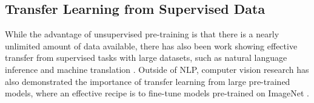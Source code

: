 \subsection {Transfer Learning from Supervised Data}
While the advantage of unsupervised pre-training is that there is a nearly unlimited amount of data available, there has also been work showing effective transfer from supervised tasks with large datasets, such as natural language inference \citep{Alexis2017} and machine translation \citep{Bryan2017}. Outside of NLP, computer vision research has also demonstrated the importance of transfer learning from large pre-trained models, where an effective recipe is to fine-tune models pre-trained on ImageNet \citep{Deng2009, Jason2014}.

